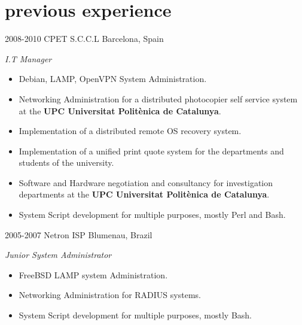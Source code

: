 \documentclass[]{friggeri-cv} %
\begin{document}
\section{previous experience}
\begin{entrylist}
\entry
{2008-2010}
{CPET S.C.C.L}
{Barcelona, Spain}
{\emph{I.T Manager} \\
\begin{itemize}
\item Debian, LAMP, OpenVPN System Administration.
\item Networking Administration for a distributed photocopier self service system at the \textbf{UPC Universitat Politènica de Catalunya}.
\item Implementation of a distributed remote OS recovery system.
\item Implementation of a unified print quote system for the departments and students of the university.
\item Software and Hardware negotiation and consultancy for investigation departments at the \textbf{UPC Universitat Politènica de Catalunya}.
\item System Script development for multiple purposes, mostly Perl and Bash.
\end{itemize}}

\entry
{2005-2007}
{Netron ISP}
{Blumenau, Brazil}
{\emph{Junior System Administrator} \\
\begin{itemize}
\item FreeBSD LAMP system Administration.
\item Networking Administration for RADIUS systems.
\item System Script development for multiple purposes, mostly Bash.
\end{itemize}}

\end{entrylist}
\end{document}

